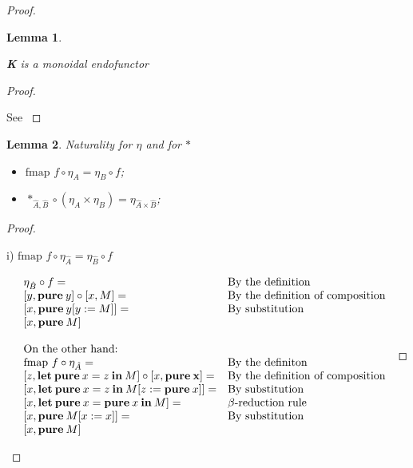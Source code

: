 \documentclass[a4paper]{article}
\newtheorem{lemma}{Lemma}
\begin{document}
\begin{proof}
\begin{lemma}
  $ $

  {\bf K} is a monoidal endofunctor
\end{lemma}

\begin{proof}
$ $

See \cite{ModalK}
\end{proof}

\begin{lemma} Naturality for $\eta$ and for $\ast$

\begin{itemize}
  \item $\text{fmap } f \circ \eta_A = \eta_B \circ f$;
  \item $\ast_{\hat{A},\hat{B}} \circ (\eta_{A} \times \eta_{B}) = \eta_{\hat{A} \times \hat{B}}$;
\end{itemize}
\end{lemma}

\begin{proof}
  $ $

  i) $\text{fmap } f \circ \eta_{\hat{A}} = \eta_{\hat{B}} \circ f$

\vspace{\baselineskip}

$\begin{array}{lll}
&\eta_{\hat{B}} \circ f = & \text{By the definition} \\
&[y, {\bf pure \:} y] \circ [x, M] = & \text{By the definition of composition}\\
&[x, {\bf pure \:} y [y := M]] = & \text{By substitution}\\
&[x, {\bf pure \:} M]& \\
& &\\
&\text{On the other hand:}& \\
&\text{fmap } f \circ \eta_{\hat{A}} = & \text{By the definiton} \\
&[z, {\bf let \: pure \:} x = z {\: \bf in \:} M] \circ [x, {\bf pure \: x}] = & \text{By the definition of composition}\\
&[x, {\bf let \: pure \:} x = z {\: \bf in \:} M [z := {\bf pure \:} x]] = & \text{By substitution} \\
&[x, {\bf let \: pure \:} x = {\bf pure \:} x {\: \bf in \:} M] = & \text{$\beta$-reduction rule}\\
&[x, {\bf pure \:} M [x := x]] = & \text{By substitution}\\
&[x, {\bf pure \:} M]&
\end{array}$


\end{proof}
\end{proof}
\end{document}
